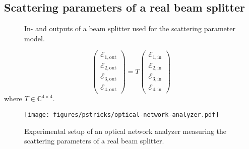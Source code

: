 \subsection{Scattering parameters of a real beam splitter}


\begin{figure}[htb]
    \centering
    
    \caption{In- and outputs of a beam splitter used for the scattering parameter model.}\label{fig:beam_splitter_scattering_parameters}
\end{figure}

\begin{equation}
    \begin{pmatrix}
        \mathcal{E}_{1,\text{out}} \\
        \mathcal{E}_{2,\text{out}} \\
        \mathcal{E}_{3,\text{out}} \\
        \mathcal{E}_{4,\text{out}}
    \end{pmatrix}
    =
    T
    \begin{pmatrix}
        \mathcal{E}_{1,\text{in}} \\
        \mathcal{E}_{2,\text{in}} \\
        \mathcal{E}_{3,\text{in}} \\
        \mathcal{E}_{4,\text{in}}
    \end{pmatrix}
\end{equation}
where $T\in\mathbb{C}^{4\times4}$.

\begin{figure}[htb]
    \centering
    \texttt{[image: figures/pstricks/optical-network-analyzer.pdf]}
    \caption{Experimental setup of an optical network analyzer measuring the scattering parameters of a real beam splitter.}\label{fig:beam_splitter_network_analyzer}
\end{figure}
